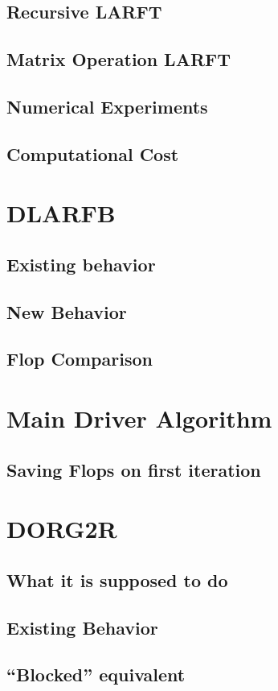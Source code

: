 \documentclass[12pt]{article}
\begin{document}
    \subsection{Recursive LARFT}
    \subsection{Matrix Operation LARFT}
    \subsection{Numerical Experiments}
    \subsection{Computational Cost}
    \section{DLARFB}
    \subsection{Existing behavior}
    \subsection{New Behavior}
    \subsection{Flop Comparison}
    \section{Main Driver Algorithm}
    \subsection{Saving Flops on first iteration}
    \section{DORG2R}
    \subsection{What it is supposed to do}
    \subsection{Existing Behavior}
    \subsection{``Blocked'' equivalent}
\end{document}

